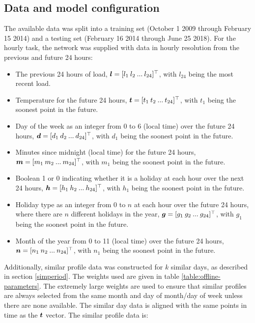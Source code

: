 \subsection{Data and  model configuration}
\label{data-model-config}
The available data was split into a training set (October 1 2009 through February 15 2014) and a testing set (February 16 2014 through June 25 2018).
For the hourly task, the network was supplied with data in hourly resolution from the previous and future 24 hours:
\begin{itemize}
	\item The previous 24 hours of load, ${\bm{l}} = [ l_1 \: l_2 \: ...  \: l_{24}]^\top$, with $l_{24}$ being the most recent load.
	\item Temperature for the future 24 hours, ${\bm{t}} = [t_1 \: t_2 \: ... \: t_{24}]^\top$, with $t_1$ being the soonest point in the future.
	\item Day of the week as an integer from 0 to 6 (local time) over the future 24 hours, ${\bm{d}} = [d_1 \: d_2 \: ... \: d_{24}]^\top$, with $d_1$ being the soonest point in the future.
	\item Minutes since midnight (local time) for the future 24 hours, ${\bm{m}} = [m_1 \: m_2 \: ... \: m_{24}]^\top$, with $m_1$ being the soonest point in the future.
	\item Boolean 1 or 0 indicating whether it is a holiday at each hour over the next 24 hours, ${\bm{h}} = [h_1 \: h_2 \: ... \: h_{24}]^\top$, with $h_1$ being the soonest point in the future.
	\item Holiday type as an integer from 0 to $n$ at each hour over the future 24 hours, where there are $n$ different holidays in the year, ${\bm{g}} = [g_1 \: g_2 \: ... \: g_{24}]^\top$, with $g_1$ being the soonest point in the future.
	\item Month of the year from 0 to 11 (local time) over the future 24 hours, ${\bm{n}} = [n_1 \: n_2 \: ... \: n_{24}]^\top$, with $n_1$ being the soonest point in the future.
\end{itemize}

Additionally, similar profile data was constructed for $k$ similar days, as described in section \ref{simperiod}.
The weights used are given in table \ref{table:offline-parameters}.
The extremely large weights are used to ensure that similar profiles are always selected from the same month and day of month/day of week unless there are none available.
The similar day data is aligned with the same points in time as the ${\bm{t}}$ vector.
The similar profile data is:

